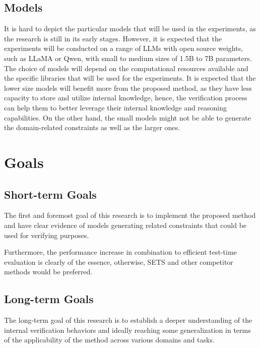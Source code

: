 \documentclass{article}
\begin{document}
\subsection{Models}
It is hard to depict the particular models that will be used in the experiments, as the research is still in its early stages. However, it is expected that the experiments will be conducted on a range of LLMs with open source weights, such as LLaMA or Qwen, with small to medium sizes of 1.5B to 7B parameters. The choice of models will depend on the computational resources available and the specific libraries that will be used for the experiments. It is expected that the lower size models will benefit more from the proposed method, as they have less capacity to store and utilize internal knowledge, hence, the verification process can help them to better leverage their internal knowledge and reasoning capabilities. On the other hand, the small models might not be able to generate the domain-related constraints as well as the larger ones.

\section{Goals}
\subsection{Short-term Goals}
The first and foremost goal of this research is to implement the proposed method and have clear evidence of models generating related constraints that could be used for verifying purposes.

Furthermore, the performance increase in combination to efficient test-time evaluation is clearly of the essence, otherwise, SETS and other competitor methods would be preferred. 

\subsection{Long-term Goals}
The long-term goal of this research is to establish a deeper understanding of the internal verification behaviors and ideally reaching some generalization in terms of the applicability of the method across various domains and tasks.



	

\end{document}
